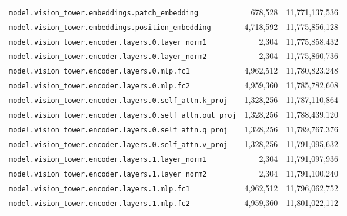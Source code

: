 \documentclass[10pt,a4paper]{article}
\theoremstyle{definition}
\begin{document}
\begin{appendices}
\begin{longtable}{p{9.5cm}rr}
\texttt{model.\allowbreak{}vision\_tower.\allowbreak{}embeddings.\allowbreak{}patch\_embedding} & 678,528 & 11,771,137,536 \\
\texttt{model.\allowbreak{}vision\_tower.\allowbreak{}embeddings.\allowbreak{}position\_embedding} & 4,718,592 & 11,775,856,128 \\
\texttt{model.\allowbreak{}vision\_tower.\allowbreak{}encoder.\allowbreak{}layers.\allowbreak{}0.\allowbreak{}layer\_norm1} & 2,304 & 11,775,858,432 \\
\texttt{model.\allowbreak{}vision\_tower.\allowbreak{}encoder.\allowbreak{}layers.\allowbreak{}0.\allowbreak{}layer\_norm2} & 2,304 & 11,775,860,736 \\
\texttt{model.\allowbreak{}vision\_tower.\allowbreak{}encoder.\allowbreak{}layers.\allowbreak{}0.\allowbreak{}mlp.\allowbreak{}fc1} & 4,962,512 & 11,780,823,248 \\
\texttt{model.\allowbreak{}vision\_tower.\allowbreak{}encoder.\allowbreak{}layers.\allowbreak{}0.\allowbreak{}mlp.\allowbreak{}fc2} & 4,959,360 & 11,785,782,608 \\
\texttt{model.\allowbreak{}vision\_tower.\allowbreak{}encoder.\allowbreak{}layers.\allowbreak{}0.\allowbreak{}self\_attn.\allowbreak{}k\_proj} & 1,328,256 & 11,787,110,864 \\
\texttt{model.\allowbreak{}vision\_tower.\allowbreak{}encoder.\allowbreak{}layers.\allowbreak{}0.\allowbreak{}self\_attn.\allowbreak{}out\_proj} & 1,328,256 & 11,788,439,120 \\
\texttt{model.\allowbreak{}vision\_tower.\allowbreak{}encoder.\allowbreak{}layers.\allowbreak{}0.\allowbreak{}self\_attn.\allowbreak{}q\_proj} & 1,328,256 & 11,789,767,376 \\
\texttt{model.\allowbreak{}vision\_tower.\allowbreak{}encoder.\allowbreak{}layers.\allowbreak{}0.\allowbreak{}self\_attn.\allowbreak{}v\_proj} & 1,328,256 & 11,791,095,632 \\
\texttt{model.\allowbreak{}vision\_tower.\allowbreak{}encoder.\allowbreak{}layers.\allowbreak{}1.\allowbreak{}layer\_norm1} & 2,304 & 11,791,097,936 \\
\texttt{model.\allowbreak{}vision\_tower.\allowbreak{}encoder.\allowbreak{}layers.\allowbreak{}1.\allowbreak{}layer\_norm2} & 2,304 & 11,791,100,240 \\
\texttt{model.\allowbreak{}vision\_tower.\allowbreak{}encoder.\allowbreak{}layers.\allowbreak{}1.\allowbreak{}mlp.\allowbreak{}fc1} & 4,962,512 & 11,796,062,752 \\
\texttt{model.\allowbreak{}vision\_tower.\allowbreak{}encoder.\allowbreak{}layers.\allowbreak{}1.\allowbreak{}mlp.\allowbreak{}fc2} & 4,959,360 & 11,801,022,112 \\

\end{longtable}
\end{appendices}
\end{document}
